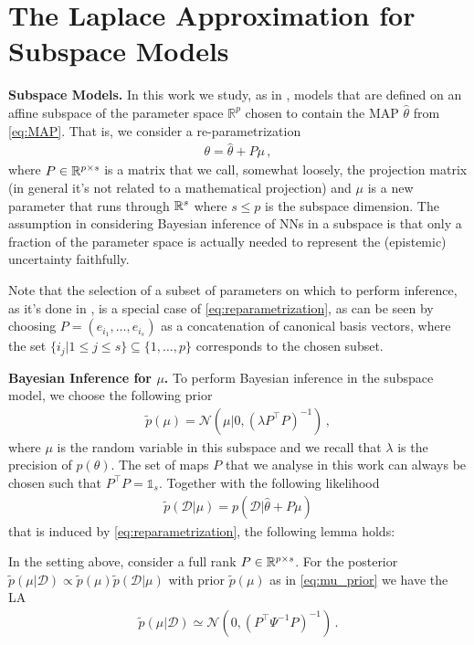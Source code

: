 \section{The Laplace Approximation for Subspace Models}
\label{sec:LA_for_subspace_models}
\textbf{Subspace Models.}
In this work we study, as in \cite{Izmailov2019}, models that are defined on an affine subspace of the parameter space $\mathbb{R}^p$ chosen to contain the MAP $\hat{\theta}$ from \eqref{eq:MAP}. That is, we consider a re-parametrization 
\begin{align}
    \label{eq:reparametrization}
    \theta = \hat{\theta} + P \mu \,,
\end{align}
where $P\in \mathbb{R}^{p\times s}$ is a matrix that we call, somewhat loosely, the projection matrix (in general it's not related to a mathematical projection) and $\mu$ is a new parameter that runs through $\mathbb{R}^s$ where $s\leq p$ is the subspace dimension.
The assumption in considering Bayesian inference of NNs in a subspace is that only a fraction of the parameter space is actually needed to represent the (epistemic) uncertainty faithfully. 

Note that the selection of a subset of parameters on which to perform inference, as it's done in \cite{Daxberger2021,Sharma2023}, is a special case of \eqref{eq:reparametrization}, as can be seen by choosing $P=(e_{i_1}, \ldots, e_{i_s})$ as a concatenation of canonical basis vectors, where the set $\{i_j | 1\leq j \leq s\}\subseteq \{1,\ldots, p\}$ corresponds to the chosen subset.


\textbf{Bayesian Inference for $\mu$.} 
To perform Bayesian inference in the subspace model, we choose the following prior 
\begin{align}
    \label{eq:mu_prior}
    \tilde{p}(\mu) = \mathcal{N}(\mu|0, \left(\lambda P^\intercal P \right)^{-1}) \,,
\end{align}
where $\mu$ is the random variable in this subspace and we recall that $\lambda$ is the precision of $p(\theta)$. The set of maps $P$ that we analyse in this work can always be chosen such that $P^\intercal P = \mathbb{1}_s$. Together with the following likelihood 
\begin{align}
    \label{eq:mu_likelihood}
    \tilde{p}(\mathcal{D}|\mu) = p(\mathcal{D} |\hat{\theta} + P\mu)
\end{align}
that is induced by \eqref{eq:reparametrization}, the following lemma holds: 
\begin{lemma}
\label{lem:Bayes_model}
In the setting above, consider a full rank $P\in \mathbb{R}^{p\times s}$.  For the posterior $\tilde{p}(\mu|\mathcal{D})\propto \tilde{p}(\mu) \tilde{p}(\mathcal{D}|\mu)$ with prior $\tilde{p}(\mu)$ as in \eqref{eq:mu_prior} we have the LA
\begin{align}
    \label{eq:LA_mu}
    \tilde{p}(\mu|\mathcal{D}) \simeq \mathcal{N}(0,(P^\intercal \Psi^{-1} P)^{-1}) \,.
\end{align}
\end{lemma}

